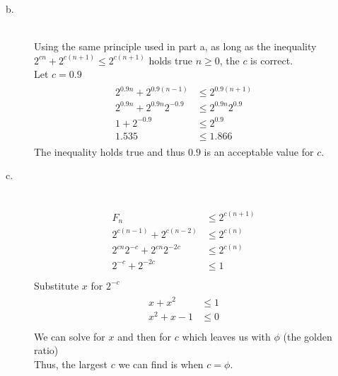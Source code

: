 \documentclass[paper=a4, fontsize=11pt]{scrartcl} %
\numberwithin{equation}{section} %
\numberwithin{figure}{section} %
\numberwithin{table}{section} %
\begin{document}
\begin{description}
\begin{description}
\begin{description}
            \end{description}
        \item[b.] \hfill \\
            Using the same principle used in part a, as long as the inequality $2^{cn} + 2^{c(n + 1)} \leq 2^{c(n + 1)}$ holds true 
            $n \geq 0$, the $c$ is correct. \\
            Let $c = 0.9$ \\
            \begin{align}
            \begin{split}
                2^{0.9n} + 2^{0.9(n - 1)} & \leq 2^{0.9(n + 1)} \\
                2^{0.9n} + 2^{0.9n}2^{-0.9} & \leq 2^{0.9n}2^{0.9} \\
                1 + 2^{-0.9} & \leq 2^{0.9} \\
                1.535 & \leq 1.866
            \end{split}
            \end{align}
            The inequality holds true and thus $0.9$ is an acceptable value for $c$.
        \item[c.] \hfill \\
            \begin{align}
            \begin{split}
                F_{n} & \leq 2^{c(n + 1)} \\
                2^{c(n - 1)} + 2^{c(n - 2)} & \leq 2^{c(n)} \\
                2^{cn}2^{-c} + 2^{cn}2^{-2c} & \leq 2^{c(n)} \\
                2^{-c} + 2^{-2c} & \leq 1 \\
            \end{split}
            \end{align}
            Substitute $x$ for $2^{-c}$
            \begin{align}
            \begin{split}
                x + x^2 & \leq 1 \\
                x^2 + x - 1 & \leq 0 \\
            \end{split}
            \end{align}
            We can solve for $x$ and then for $c$ which leaves us with $\phi$ (the golden ratio) \\
            Thus, the largest $c$ we can find is when $c = \phi$.
        \end{description}

\end{description}
\end{document}
